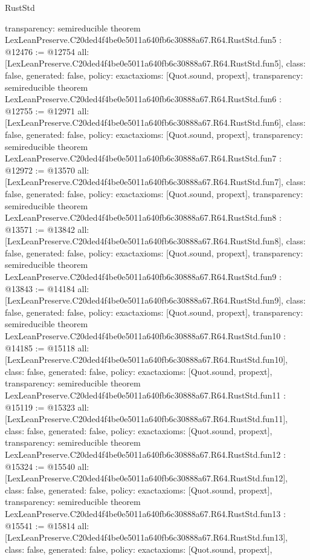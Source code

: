 \begin{lexlean}{RustStd}
\begin{coremodule}
{  transparency: semireducible
}
theorem LexLeanPreserve.C20ded4f4be0e5011a640fb6c30888a67.R64.RustStd.fun5 : @12476 := @12754 {
  all: [LexLeanPreserve.C20ded4f4be0e5011a640fb6c30888a67.R64.RustStd.fun5],
  class: false,
  generated: false,
  policy: exact{axioms: [Quot.sound, propext]},
  transparency: semireducible
}
theorem LexLeanPreserve.C20ded4f4be0e5011a640fb6c30888a67.R64.RustStd.fun6 : @12755 := @12971 {
  all: [LexLeanPreserve.C20ded4f4be0e5011a640fb6c30888a67.R64.RustStd.fun6],
  class: false,
  generated: false,
  policy: exact{axioms: [Quot.sound, propext]},
  transparency: semireducible
}
theorem LexLeanPreserve.C20ded4f4be0e5011a640fb6c30888a67.R64.RustStd.fun7 : @12972 := @13570 {
  all: [LexLeanPreserve.C20ded4f4be0e5011a640fb6c30888a67.R64.RustStd.fun7],
  class: false,
  generated: false,
  policy: exact{axioms: [Quot.sound, propext]},
  transparency: semireducible
}
theorem LexLeanPreserve.C20ded4f4be0e5011a640fb6c30888a67.R64.RustStd.fun8 : @13571 := @13842 {
  all: [LexLeanPreserve.C20ded4f4be0e5011a640fb6c30888a67.R64.RustStd.fun8],
  class: false,
  generated: false,
  policy: exact{axioms: [Quot.sound, propext]},
  transparency: semireducible
}
theorem LexLeanPreserve.C20ded4f4be0e5011a640fb6c30888a67.R64.RustStd.fun9 : @13843 := @14184 {
  all: [LexLeanPreserve.C20ded4f4be0e5011a640fb6c30888a67.R64.RustStd.fun9],
  class: false,
  generated: false,
  policy: exact{axioms: [Quot.sound, propext]},
  transparency: semireducible
}
theorem LexLeanPreserve.C20ded4f4be0e5011a640fb6c30888a67.R64.RustStd.fun10 : @14185 := @15118 {
  all: [LexLeanPreserve.C20ded4f4be0e5011a640fb6c30888a67.R64.RustStd.fun10],
  class: false,
  generated: false,
  policy: exact{axioms: [Quot.sound, propext]},
  transparency: semireducible
}
theorem LexLeanPreserve.C20ded4f4be0e5011a640fb6c30888a67.R64.RustStd.fun11 : @15119 := @15323 {
  all: [LexLeanPreserve.C20ded4f4be0e5011a640fb6c30888a67.R64.RustStd.fun11],
  class: false,
  generated: false,
  policy: exact{axioms: [Quot.sound, propext]},
  transparency: semireducible
}
theorem LexLeanPreserve.C20ded4f4be0e5011a640fb6c30888a67.R64.RustStd.fun12 : @15324 := @15540 {
  all: [LexLeanPreserve.C20ded4f4be0e5011a640fb6c30888a67.R64.RustStd.fun12],
  class: false,
  generated: false,
  policy: exact{axioms: [Quot.sound, propext]},
  transparency: semireducible
}
theorem LexLeanPreserve.C20ded4f4be0e5011a640fb6c30888a67.R64.RustStd.fun13 : @15541 := @15814 {
  all: [LexLeanPreserve.C20ded4f4be0e5011a640fb6c30888a67.R64.RustStd.fun13],
  class: false,
  generated: false,
  policy: exact{axioms: [Quot.sound, propext]},
}
\end{coremodule}
\end{lexlean}
